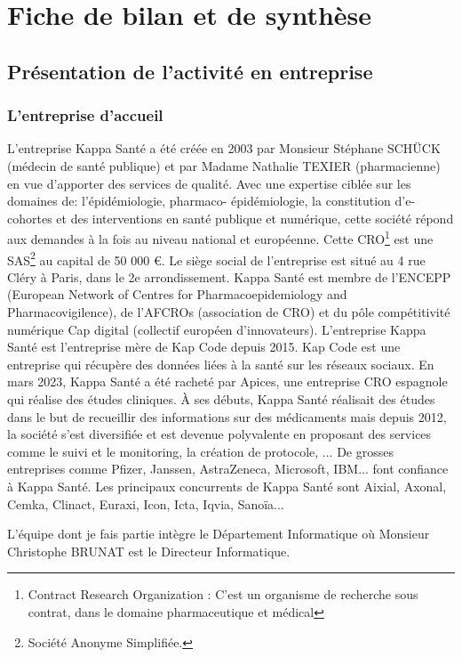 \section{Fiche de bilan et de synthèse}
\subsection{Présentation de l'activité en entreprise}
\subsubsection{L'entreprise d'accueil}
L’entreprise Kappa Santé a été créée en 2003 par Monsieur Stéphane SCHÜCK (médecin de
santé publique) et par Madame Nathalie TEXIER (pharmacienne) en vue d’apporter des
services de qualité. Avec une expertise ciblée sur les domaines de:
l’épidémiologie, pharmaco- épidémiologie, la constitution d’e-cohortes et des
interventions en santé publique et numérique, cette société répond aux
demandes à la fois au niveau national et européenne.
Cette CRO\footnote{Contract Research Organization : C'est un organisme de recherche sous contrat, dans le domaine pharmaceutique et médical} est une SAS\footnote{Société Anonyme
Simplifiée.} au capital de 50 000 €.
Le siège social de l’entreprise est situé au 4 rue Cléry à Paris, dans le 2e
arrondissement.
Kappa Santé est membre de l’ENCEPP (European Network of Centres for
Pharmacoepidemiology and Pharmacovigilence), de l’AFCROs (association de
CRO) et du pôle compétitivité numérique Cap digital (collectif européen
d’innovateurs).
L’entreprise Kappa Santé est l’entreprise mère de Kap Code depuis 2015. Kap
Code est une entreprise qui récupère des données liées à la santé sur les
réseaux sociaux.
En mars 2023, Kappa Santé a été racheté par Apices, une entreprise CRO
espagnole qui réalise des études cliniques.
À ses débuts, Kappa Santé réalisait des études dans le but de recueillir des
informations sur des médicaments mais depuis 2012, la société s’est diversifiée
et est devenue polyvalente en proposant des services comme le suivi et le
monitoring, la création de protocole, ...
De grosses entreprises comme Pfizer, Janssen, AstraZeneca, Microsoft, IBM... font confiance à Kappa Santé. Les principaux concurrents de Kappa Santé sont
Aixial, Axonal, Cemka, Clinact, Euraxi, Icon, Icta, Iqvia, Sanoïa...

L’équipe dont je fais partie intègre le Département Informatique où Monsieur Christophe BRUNAT est le Directeur Informatique.

